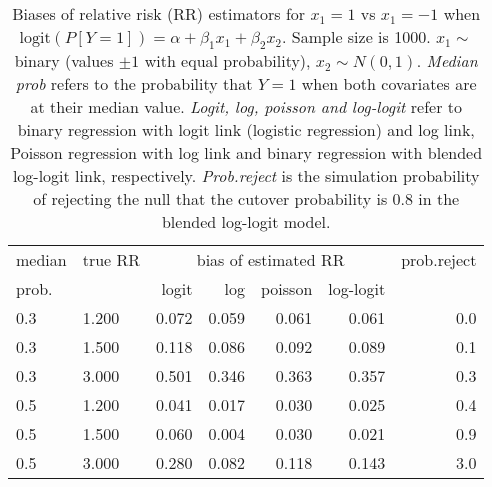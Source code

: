 \documentclass[12pt,a4paper]{article}
\begin{document}
\begin{table}[H] 
\small\sf\centering 
\caption{Biases of relative risk (RR) estimators for $x_1=1$ vs $x_1=-1$ when $\mbox{logit}(P[Y=1])=\alpha+\beta_1 x_1 + \beta_2 x_2$. Sample size is 1000. $x_1 \sim $binary (values $\pm 1$ with equal probability), $x_2 \sim N(0,1)$. {\it Median prob} refers to the probability that $Y=1$ when both covariates are at their median value. {\it Logit, log, poisson and log-logit} refer to binary regression with logit link (logistic regression) and log link, Poisson regression with log link and binary regression with blended log-logit link, respectively. {\it Prob.reject} is the simulation probability of rejecting the null that the cutover probability is $0.8$ in the blended log-logit model.} 
\begin{tabular}{llrrrrr} 
\toprule 
median & true RR & \multicolumn{4}{c}{bias of estimated RR} & prob.reject \\ 
prob. & & logit & log & poisson & log-logit  & \\ \midrule 
0.3 & 1.200 & 0.072 & 0.059 & 0.061 & 0.061 & 0.0 \\  
0.3 & 1.500 & 0.118 & 0.086 & 0.092 & 0.089 & 0.1 \\  
0.3 & 3.000 & 0.501 & 0.346 & 0.363 & 0.357 & 0.3 \\  
0.5 & 1.200 & 0.041 & 0.017 & 0.030 & 0.025 & 0.4 \\  
0.5 & 1.500 & 0.060 & 0.004 & 0.030 & 0.021 & 0.9 \\  
0.5 & 3.000 & 0.280 & 0.082 & 0.118 & 0.143 & 3.0 \\  
\bottomrule 
\end{tabular} 
\end{table} 
\end{document}
